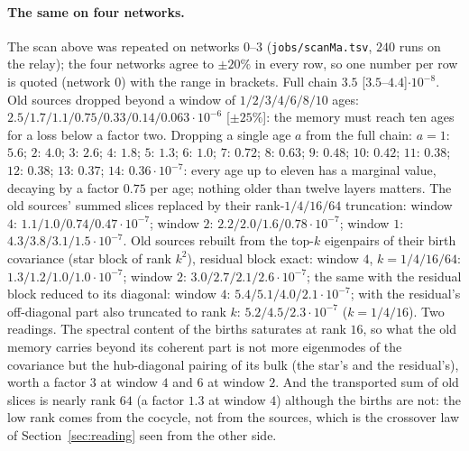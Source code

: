 \paragraph{The same on four networks.} The scan above was repeated on networks $0$--$3$ (\texttt{jobs/scanMa.tsv}, $240$ runs
on the relay); the four networks agree to $\pm20\%$ in every row, so one number per row is quoted (network $0$) with
the range in brackets. Full chain $3.5$ [$3.5$--$4.4$]$\cdot10^{-8}$. Old sources dropped beyond a window of
$1/2/3/4/6/8/10$ ages: $2.5/1.7/1.1/0.75/0.33/0.14/0.063\cdot10^{-6}$ [$\pm25\%$]: the memory must reach ten ages
for a loss below a factor two. Dropping a single age $a$ from the full chain: $a=1$: $5.6$; $2$: $4.0$; $3$: $2.6$;
$4$: $1.8$; $5$: $1.3$; $6$: $1.0$; $7$: $0.72$; $8$: $0.63$; $9$: $0.48$; $10$: $0.42$; $11$: $0.38$; $12$: $0.38$;
$13$: $0.37$; $14$: $0.36\cdot10^{-7}$: every age up to eleven has a marginal value, decaying by a factor $0.75$ per
age; nothing older than twelve layers matters. The old sources' summed slices replaced by their rank-$1/4/16/64$
truncation: window $4$: $1.1/1.0/0.74/0.47\cdot10^{-7}$; window $2$: $2.2/2.0/1.6/0.78\cdot10^{-7}$; window $1$:
$4.3/3.8/3.1/1.5\cdot10^{-7}$. Old sources rebuilt from the top-$k$ eigenpairs of their birth covariance (star block
of rank $k^2$), residual block exact: window $4$, $k=1/4/16/64$: $1.3/1.2/1.0/1.0\cdot10^{-7}$; window $2$:
$3.0/2.7/2.1/2.6\cdot10^{-7}$; the same with the residual block reduced to its diagonal: window $4$:
$5.4/5.1/4.0/2.1\cdot10^{-7}$; with the residual's off-diagonal part also truncated to rank $k$: $5.2/4.5/2.3\cdot10^{-7}$
($k=1/4/16$). Two readings. The spectral content of the births saturates at rank $16$, so what the old memory
carries beyond its coherent part is not more eigenmodes of the covariance but the hub-diagonal pairing of its bulk
(the star's and the residual's), worth a factor $3$ at window $4$ and $6$ at window $2$. And the transported sum of old
slices is nearly rank $64$ (a factor $1.3$ at window $4$) although the births are not: the low rank comes from the
cocycle, not from the sources, which is the crossover law of Section~\ref{sec:reading} seen from the other side.

